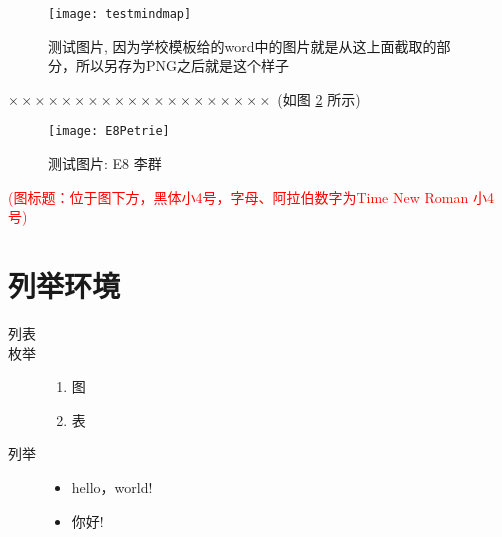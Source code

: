 \documentclass[a4paper]{article}
\newcommand{\sectionbreak}{\clearpage} %
\theoremstyle{definition}
\theoremstyle{plain}
\theoremstyle{remark}
\newcommand{\reffig}[1]{图 \ref{#1}}
\begin{document}
\begin{figure}[H]
	\centering
	\texttt{[image: testmindmap]}
	\caption{测试图片, 因为学校模板给的word中的图片就是从这上面截取的部分，所以另存为PNG之后就是这个样子}
	\label{testfig}
\end{figure}
$ \times\times\times\times\times\times\times\times\times\times\times\times\times\times\times\times\times\times\times\times $  (如\reffig{E8} 所示)
\begin{figure}[H]
	\centering
	\texttt{[image: E8Petrie]}
	\caption{测试图片: E8 李群}
	\label{E8}
\end{figure}
\textcolor{red}{(图标题：位于图下方，黑体小4号，字母、阿拉伯数字为Time New Roman 小4号)}


\section{列举环境}
\begin{description}
	\item[列表]
	\item[枚举] \begin{enumerate}
			\item 图
			\item 表
		\end{enumerate}
	\item[列举] \begin{itemize}
			\item hello，world!

			\item 你好! \cite{Varju2018}
		\end{itemize}
\end{description}



\sectionbreak

\end{document}
